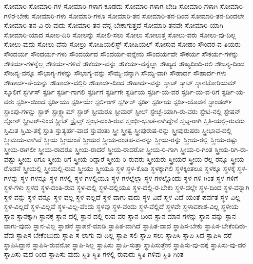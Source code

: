 {ಸೋಮಾರಿ
ಸೋಮಾರಿ-ಗಳ
ಸೋಮಾರಿ-ಗಳಾಗ-ಕೂಡದು
ಸೋಮಾರಿ-ಗಳಾಗ-ಬೇಡಿ
ಸೋಮಾರಿ-ಗಳಾಗಿ
ಸೋಮಾರಿ-ಗಳಿರ-ಬೇಕು
ಸೋಮಾರಿ-ಗಳು
ಸೋಮಾರಿ-ಗಳೂ
ಸೋಮಾರಿ-ತನ
ಸೋಮಾರಿ-ತನ-ದಿಂದ
ಸೋಮಾರಿ-ತನ-ದಿಂದಲೇ
ಸೋಮಾರಿ-ತನ-ವಿ-ರು-ವುದು
ಸೋಮಾರಿ-ತನ-ವೆನ್ನ-ಬೇಕಾಗುತ್ತದೆ
ಸೋಮಾರಿ-ತನವೇ
ಸೋಮಾರಿ-ಯಾಗಿ
ಸೋಮಾರಿ-ಯಾದ
ಸೋಲ-ದಿರಿ
ಸೋಲನ್ನು
ಸೋಲಿ-ಸಲು
ಸೋಲು
ಸೋಲುತ್ತ
ಸೋಲು-ವರು
ಸೋಲು-ವು-ದಿಲ್ಲ
ಸೋಲು-ವುದು
ಸೋಲು-ವೆನು
ಸೋಲ್ರು
ಸೋಷಿಯಲಿಸ್ಟ್
ಸೋಷಿಯಲ್
ಸೋಸುವ
ಸೋಹಂ
ಸೌಂದರ-ವ-ತಿಯರು
ಸೌಂದರ್ಯ
ಸೌಂದರ್ಯ-ಗಳು
ಸೌಂದರ್ಯದ
ಸೌಂದರ್ಯ-ವನ್ನೇನು
ಸೌಂದರ್ಯವೇ
ಸೌಕರ್ಯ
ಸೌಕರ್ಯ-ಗಳನ್ನು
ಸೌಕರ್ಯ-ಗಳನ್ನೆಲ್ಲ
ಸೌಕರ್ಯ-ಗಳಿವೆ
ಸೌಕರ್ಯ-ವನ್ನು
ಸೌಕರ್ಯ-ವನ್ನೆಲ್ಲಾ
ಸೌಖ್ಯದ
ಸೌಖ್ಯದಿಂದಿ-ರಲಿ
ಸೌಜನ್ಯ-ದಿಂದ
ಸೌಜನ್ಯ-ವನ್ನೂ
ಸೌಭಾಗ್ಯ-ಗಳನ್ನು
ಸೌಭಾಗ್ಯ-ವನ್ನು
ಸೌಮ್ಯ-ವನ್ನಾಗಿ
ಸೌಮ್ಯ-ವಾಗಿ
ಸೌಹಾರ್ದ
ಸೌಹಾರ್ದ-ಗಳು
ಸೌಹಾರ್ದ-ತೆ-ಯನ್ನು
ಸೌಹಾರ್ದ-ದಲ್ಲಿರಿ
ಸೌಹಾರ್ದ-ದಿಂದ
ಸೌಹಾರ್ದ-ವನ್ನು
ಸ್ಕಾಚ್
ಸ್ಕಾಟ್
ಸ್ಕಾನಟೋರಿಯಮ್
ಸ್ಕೂಲಿಗೆ
ಸ್ಟರ್ಗಿಸ್
ಸ್ಟರ್ಡಿ
ಸ್ಟರ್ಡಿ-ಗಾಗಲಿ
ಸ್ಟರ್ಡಿಗೆ
ಸ್ಟರ್ಡಿಗೇ
ಸ್ಟರ್ಡಿಯ
ಸ್ಟರ್ಡಿ-ಯ-ವರ
ಸ್ಟರ್ಡಿ-ಯ-ವ-ರಿಗೆ
ಸ್ಟರ್ಡಿ-ಯ-ವರು
ಸ್ಟರ್ಡಿ-ಯಿಂದ
ಸ್ಟರ್ಡಿಯು
ಸ್ಟರ್ಡಿಯೇ
ಸ್ಟರ್ಲಿಂಗ್
ಸ್ಟರ್ಗಿಸ್
ಸ್ಟರ್ಡಿ
ಸ್ಟರ್ಡಿಯ
ಸ್ಟರ್ಡಿ-ಯೊಡನೆ
ಸ್ಟಾಂಡರ್ಡ್
ಸ್ಟಾಂಪು-ಗಳನ್ನು
ಸ್ಟಾಕ್
ಸ್ಟಾಕ್ಹ್ಯಾಮ್
ಸ್ಟಾರ್
ಸ್ಟೀಮರೂ
ಸ್ಟೀಮರ್
ಸ್ಟೀಲ್
ಸ್ಟೇಚ್ಛೆ-ಯಾಗಿ-ರು-ವರು
ಸ್ಟೇಟಿ-ನಲ್ಲಿ
ಸ್ಟೇಷನ್
ಸ್ಟೋನ್
ಸ್ಟ್ರೀಟರ್-ನಿಂದ
ಸ್ಟ್ರೀಟ್
ಸ್ಟ್ರೈಟ್ಸ್
ಸ್ತಂಭ-ದಂತಿ-ರುವ
ಸ್ತಂಭೀ-ಭೂತ-ನಾಗಿದ್ದೇನೆ
ಸ್ತಬ್ದ-ರಾಗಿ
ಸ್ತಿತಿ-ಯಲ್ಲಿ-ರುವರು
ಸ್ತಿಮಿತ
ಸ್ತಿಮಿ-ತಕ್ಕೆ
ಸ್ತುತಿ
ಸ್ತುತ್ಯರ್ಹ-ವಾದ
ಸ್ತುವಂತು
ಸ್ತ್ರೀ
ಸ್ತ್ರೀತ್ವ
ಸ್ತ್ರೀಪುರುಷ-ರನ್ನು
ಸ್ತ್ರೀಪುರುಷರು
ಸ್ತ್ರೀಭಾವ-ದಲ್ಲಿ
ಸ್ತ್ರೀಮಯ-ವಾಗಿವೆ
ಸ್ತ್ರೀಯ
ಸ್ತ್ರೀಯಂತೆ
ಸ್ತ್ರೀಯರ
ಸ್ತ್ರೀಯ-ರಂತಹ-ವ-ರನ್ನು
ಸ್ತ್ರೀಯ-ರನ್ನು
ಸ್ತ್ರೀಯ-ರಲ್ಲಿ
ಸ್ತ್ರೀಯ-ರಷ್ಟು
ಸ್ತ್ರೀಯ-ರಾಗಲೀ
ಸ್ತ್ರೀಯ-ರಾದರೂ
ಸ್ತ್ರೀಯ-ರಾದರೆ
ಸ್ತ್ರೀಯ-ರಾದರೋ
ಸ್ತ್ರೀಯ-ರಿ-ಗಾಗಿ
ಸ್ತ್ರೀಯ-ರಿ-ಗಿಂತ
ಸ್ತ್ರೀಯ-ರಿಗಿ-ರು-ವಷ್ಟು
ಸ್ತ್ರೀಯ-ರಿಗೂ
ಸ್ತ್ರೀಯ-ರಿಗೆ
ಸ್ತ್ರೀಯ-ರಿದ್ದಾರೆ
ಸ್ತ್ರೀಯ-ರಿ-ರುವರು
ಸ್ತ್ರೀಯರು
ಸ್ತ್ರೀಯರೆ
ಸ್ತ್ರೀಯ-ರೆಲ್ಲ-ರನ್ನೂ
ಸ್ತ್ರೀಯ-ರೊಡನೆ
ಸ್ತ್ರೀಯಲ್ಲಿ
ಸ್ತ್ರೀಯಲ್ಲಿ-ರುವ
ಸ್ತ್ರೀಯು
ಸ್ತ್ರೀಯೂ
ಸ್ಥಳ
ಸ್ಥಳ-ಕೊಡಿ
ಸ್ಥಳಕ್ಕಾಗಲಿ
ಸ್ಥಳಕ್ಕಿಂತಲೂ
ಸ್ಥಳಕ್ಕೂ
ಸ್ಥಳಕ್ಕೆ
ಸ್ಥಳ-ಗಳನ್ನು
ಸ್ಥಳ-ಗಳನ್ನೂ
ಸ್ಥಳ-ಗಳಲ್ಲಿ
ಸ್ಥಳ-ಗಳಲ್ಲಿಯೂ
ಸ್ಥಳ-ಗಳಲ್ಲೆಲ್ಲಾ
ಸ್ಥಳ-ಗಳಲ್ಲೊಂದು
ಸ್ಥಳ-ಗಳಿ-ಗಿಂತ
ಸ್ಥಳ-ಗಳಿಗೆ
ಸ್ಥಳ-ಗಳು
ಸ್ಥಳದ
ಸ್ಥಳ-ದಂತಿ-ರುವ
ಸ್ಥಳ-ದಲ್ಲಿ
ಸ್ಥಳ-ದಲ್ಲಿಯೂ
ಸ್ಥಳ-ದಲ್ಲಿ-ರ-ಬೇಕು
ಸ್ಥಳ-ದಲ್ಲೇ
ಸ್ಥಳ-ದಿಂದ
ಸ್ಥಳ-ವನ್ನಾಗಿ
ಸ್ಥಳ-ವನ್ನು
ಸ್ಥಳ-ವನ್ನೂ
ಸ್ಥಳ-ವಲ್ಲ
ಸ್ಥಳ-ವಲ್ಲದೆ
ಸ್ಥಳ-ವಾಗು-ವುದು
ಸ್ಥಳ-ವಿದೆ
ಸ್ಥಳ-ವಿದೆ-ಯಂತೆ-ಪರ್ವತ
ಸ್ಥಳ-ವಿಲ್ಲ
ಸ್ಥಳ-ವಿಲ್ಲದೆ
ಸ್ಥಳ-ವಿಲ್ಲವೆ
ಸ್ಥಳ-ವಿಲ್ಲ-ವೆಂದು
ಸ್ಥಳವು
ಸ್ಥಳ-ವೆಂದು
ಸ್ಥಳ-ವೆಲ್ಲಿದೆ
ಸ್ಥಳವೇ
ಸ್ಥಳಾವಕಾಶ-ವಿಲ್ಲ
ಸ್ಥಳೀಯ
ಸ್ಥಾನ
ಸ್ಥಾನಕ್ಕಾಗಿ
ಸ್ಥಾನಕ್ಕೆ
ಸ್ಥಾನ-ದಲ್ಲಿ
ಸ್ಥಾನ-ದಲ್ಲಿ-ರುವ-ವರ
ಸ್ಥಾನ-ದಿಂದ
ಸ್ಥಾನ-ಮಾನ-ಗಳನ್ನು
ಸ್ಥಾನ-ವನ್ನು
ಸ್ಥಾನ-ವಾಗು-ವುದು
ಸ್ಥಾನ-ವಿಲ್ಲ
ಸ್ಥಾಪನೆ
ಸ್ಥಾಪನೆ-ಮಾಡಿ
ಸ್ಥಾಪಿತ-ವಾಗಿದೆ
ಸ್ಥಾಪಿತ-ವಾದ
ಸ್ಥಾಪಿಸ-ಬೇಕು
ಸ್ಥಾಪಿಸ-ಬೇಕೆಂದಿರು-ವೆವು
ಸ್ಥಾಪಿಸ-ಬೇಕೆಂಬುದು
ಸ್ಥಾಪಿ-ಸ-ಲಾಗು-ವು-ದಿಲ್ಲ
ಸ್ಥಾಪಿ-ಸಲಿ
ಸ್ಥಾಪಿ-ಸಲು
ಸ್ಥಾಪಿಸಿ
ಸ್ಥಾಪಿ-ಸಿದ
ಸ್ಥಾಪಿಸಿ-ದರೆ
ಸ್ಥಾಪಿಸಿದ್ದಾನೆ
ಸ್ಥಾಪಿಸಿ-ರುವನೋ
ಸ್ಥಾಪಿ-ಸಿಲ್ಲ
ಸ್ಥಾಪಿಸು
ಸ್ಥಾಪಿ-ಸುತ್ತಾ
ಸ್ಥಾಪಿಸುತ್ತೇನೆ
ಸ್ಥಾಪಿಸು-ವು-ದಕ್ಕೆ
ಸ್ಥಾಪಿಸು-ವು-ದರ
ಸ್ಥಾಪಿಸು-ವುದ-ರಿಂದ
ಸ್ಥಾಪಿಸು-ವುದು
ಸ್ಥಿತಿ
ಸ್ಥಿತಿ-ಗಳಲ್ಲಿ-ರುವುದು
ಸ್ಥಿತಿ-ಗಳಿವು
ಸ್ಥಿತಿ-ಗಿಂತ
}
